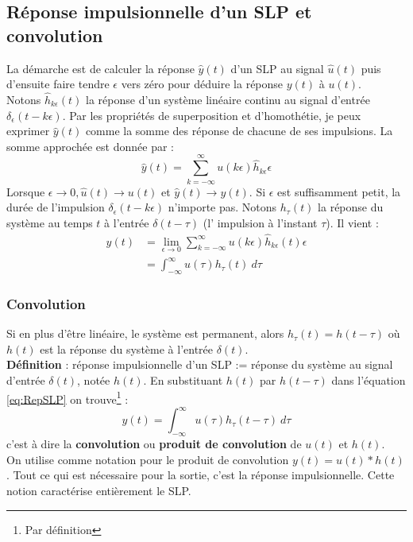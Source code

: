 \subsection{Réponse impulsionnelle d'un SLP et convolution}
La démarche est de calculer la réponse $\hat{y}(t)$ d'un SLP au signal
$\hat{u}(t)$ puis d'ensuite faire tendre $\epsilon$ vers zéro pour 
déduire la réponse $y(t)$ à $u(t)$.\\
Notons $\hat{h}_{k\epsilon}(t)$ la réponse d'un système linéaire continu 
au signal d'entrée $\delta_\epsilon(t-k\epsilon)$. Par les propriétés de 
superposition et d'homothétie, je peux exprimer $\hat{y}(t)$ comme la 
somme des réponse de chacune de ses impulsions. La somme approchée est 
donnée par : 
\begin{equation}
	\hat{y}(t) = \sum_{k=-\infty}^\infty u(k\epsilon)\hat{h}_{k\epsilon}
	\epsilon
\end{equation}
Lorsque $\epsilon\rightarrow0, \hat{u}(t)\rightarrow u(t)$ et $\hat{y}
(t) \rightarrow y(t)$. Si $\epsilon$ est suffisamment petit, la durée de 
l'impulsion $\delta_\epsilon(t-k\epsilon)$ n'importe pas. Notons $h_\tau(t
)$ la réponse du système au temps $t$ à l'entrée $\delta(t-\tau)$ (l'
impulsion à l'instant $\tau$). Il vient : 
\begin{equation}
	\begin{array}{ll}
		y(t) & = \lim\limits_{\epsilon\rightarrow0} \sum_{k=-\infty}^\infty u(k\epsilon) 
		\hat{h}_{k\epsilon}(t)\epsilon\\
		     & = \int_{-\infty}^\infty u(\tau)h_\tau(t)\ d\tau                           
	\end{array}
	\label{eq:RepSLP}
\end{equation}
	
\subsubsection{Convolution}
Si en plus d'\^etre linéaire, le système est permanent, alors $h_\tau(
t) = h(t-\tau)$ où $h(t)$ est la réponse du système à l'entrée $\delta
(t)$.\\
\textbf{Définition} : réponse impulsionnelle d'un SLP := réponse du
système au signal d'entrée $\delta(t)$, notée $h(t)$. En substituant 
$h(t)$ par $h(t-\tau)$ dans l'équation \autoref{eq:RepSLP} on 
trouve\footnote{Par définition} :
\begin{equation}
	y(t) = \int_{-\infty}^\infty u(\tau)h_\tau(t-\tau)\ d\tau
\end{equation}
c'est à dire la \textbf{convolution} ou \textbf{produit de convolution} 
de $u(t)$ et $h(t)$.\\
On utilise comme notation pour le produit de convolution $y(t) = u(t)*
h(t)$. Tout ce qui est nécessaire pour la sortie, c'est la réponse 
impulsionnelle. Cette notion caractérise entièrement le SLP.
	
